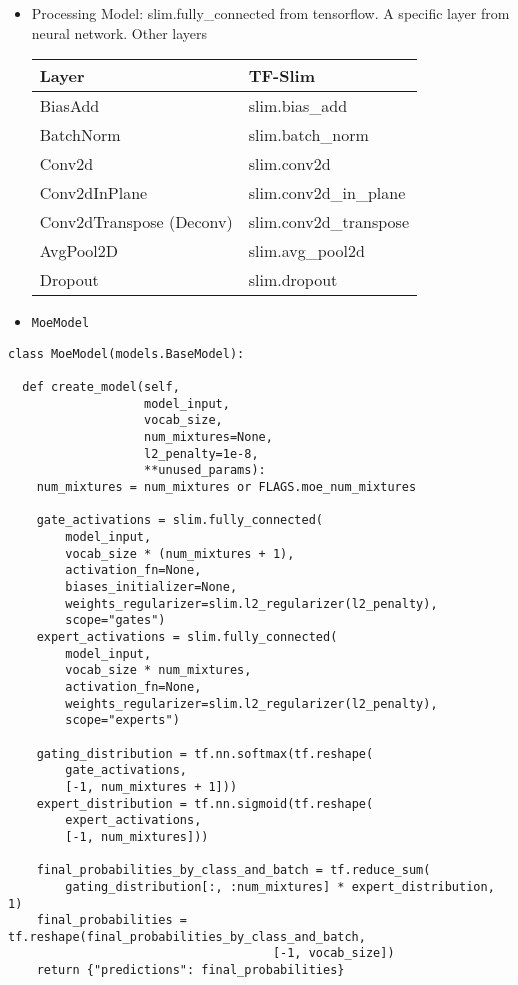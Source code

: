 \documentclass[11pt]{article}
\begin{document}
\begin{enumerate}
\begin{itemize}
\item Processing Model: slim.fully\_connected from tensorflow. A specific layer from neural network.
Other layers
\begin{center}
\begin{tabular}{ll}
\hline
Layer & TF-Slim\\
\hline
BiasAdd & slim.bias\_add\\
BatchNorm & slim.batch\_norm\\
Conv2d & slim.conv2d\\
Conv2dInPlane & slim.conv2d\_in\_plane\\
Conv2dTranspose (Deconv) & slim.conv2d\_transpose\\
AvgPool2D & slim.avg\_pool2d\\
Dropout & slim.dropout\\
\hline
\end{tabular}
\end{center}
\end{itemize}




\begin{itemize}
\item \texttt{MoeModel}
\end{itemize}
\begin{verbatim}
class MoeModel(models.BaseModel):

  def create_model(self,
                   model_input,
                   vocab_size,
                   num_mixtures=None,
                   l2_penalty=1e-8,
                   **unused_params):
    num_mixtures = num_mixtures or FLAGS.moe_num_mixtures

    gate_activations = slim.fully_connected(
        model_input,
        vocab_size * (num_mixtures + 1),
        activation_fn=None,
        biases_initializer=None,
        weights_regularizer=slim.l2_regularizer(l2_penalty),
        scope="gates")
    expert_activations = slim.fully_connected(
        model_input,
        vocab_size * num_mixtures,
        activation_fn=None,
        weights_regularizer=slim.l2_regularizer(l2_penalty),
        scope="experts")

    gating_distribution = tf.nn.softmax(tf.reshape(
        gate_activations,
        [-1, num_mixtures + 1]))
    expert_distribution = tf.nn.sigmoid(tf.reshape(
        expert_activations,
        [-1, num_mixtures]))

    final_probabilities_by_class_and_batch = tf.reduce_sum(
        gating_distribution[:, :num_mixtures] * expert_distribution, 1)
    final_probabilities = tf.reshape(final_probabilities_by_class_and_batch,
                                     [-1, vocab_size])
    return {"predictions": final_probabilities}
\end{verbatim}


\end{enumerate}
\end{document}
